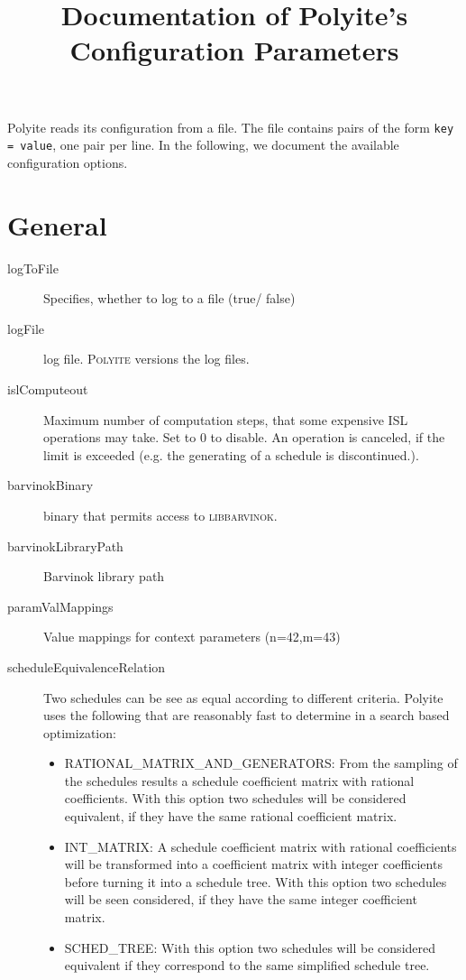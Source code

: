 \documentclass{article}
\begin{document}
\title{Documentation of Polyite's Configuration Parameters}
\maketitle
Polyite reads its configuration from a file. The file contains pairs of the form
\texttt{key = value}, one pair per line. In the following, we document the available configuration options.

\section{General}
\begin{description}
  \item[logToFile] Specifies, whether to log to a file (true/ false)
  \item[logFile] log file. \textsc{Polyite} versions the log files.
  \item[islComputeout] Maximum number of computation steps, that some expensive
    ISL operations may take. Set to 0 to disable. An operation is canceled, if
    the limit is exceeded (e.g. the generating of a schedule is discontinued.).
  \item[barvinokBinary] binary that permits access to \textsc{libbarvinok}.
  \item[barvinokLibraryPath] Barvinok library path
  \item[paramValMappings] Value mappings for context parameters (n=42,m=43)
  \item[scheduleEquivalenceRelation] Two schedules can be see as equal according
    to different criteria. Polyite uses the following that are reasonably fast
    to determine in a search based optimization:
    \begin{itemize}
      \item RATIONAL\_MATRIX\_AND\_GENERATORS: From the sampling of the schedules
        results a schedule coefficient matrix with rational coefficients. With
        this option two schedules will be considered equivalent, if they have
        the same rational coefficient matrix.
      \item INT\_MATRIX: A schedule coefficient matrix with rational
        coefficients will be transformed into a coefficient matrix with integer
        coefficients before turning it into a schedule tree. With this option
        two schedules will  be seen considered, if they have the same integer
        coefficient matrix.
      \item SCHED\_TREE: With this option two schedules will be considered
        equivalent if they correspond to the same simplified schedule tree.
    \end{itemize}
\end{description}
\end{document}

